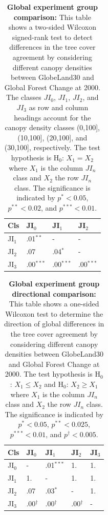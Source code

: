 			\begin{table}[ht]
				\centering
				\caption[Global experiment group comparison]{\textbf{Global experiment group comparison:} This table shows a two-sided Wilcoxon signed-rank test to detect differences in the tree cover agreement by considering different canopy densities between GlobeLand30 and Global Forest Change at 2000. The classes $JI_0$, $JI_1$, $JI_2$, and $JI_3$ as row and column headings account for the canopy density classes (0,100], (10,100], (20,100], and (30,100], respectively. The test hypothesis is H$_0$: $X_1=X_2$ where $X_1$ is the column $JI_n$ class and $X_2$ the row $JI_n$ class. The significance is indicated by $p^{*}<0.05$, $p^{**}<0.02$, and $p^{***}<0.01$.}
				\label{tab:wilcoxontwosided_all}
				\begin{tabular}{llll}
					\hline
					Cls & JI$_0$ & JI$_1$ & JI$_2$ \\\hline
					JI$_1$ & .01$^{**}$ & - & - \\
					JI$_2$ & .07 & .04$^{*}$ & - \\
					JI$_3$ & .00$^{***}$ & .00$^{***}$ & .00$^{***}$ \\\hline
				\end{tabular}
			\end{table}
			\begin{table}[ht]
				\centering
				\caption[Global experiment group directional comparison]{\textbf{Global experiment group directional comparison:} This table shows a one-sided Wilcoxon test to determine the direction of global differences in the tree cover agreement by considering different canopy densities between GlobeLand30 and Global Forest Change at 2000. The test hypothesis is H$_0$: $X_1\leq X_2$ and H$_0$: $X_2\geq X_1$ where $X_1$ is the column $JI_n$ class and $X_2$ the row $JI_n$ class. The significance is indicated by $p^{*}<0.05$, $p^{**}<0.025$, $p^{***}<0.01$, and $p^{\dagger}<0.005$.}
				\label{tab:wilcoxononesided_all}
				\begin{tabular}{lllll}
					\hline
					Cls & JI$_0$ & JI$_1$ & JI$_2$ & JI$_3$ \\\hline
					JI$_0$ & - & .01$^{***}$ & 1. & 1. \\
					JI$_1$ & 1. & - & 1. & 1. \\
					JI$_2$ & .07 & .03$^{*}$ & - & 1. \\
					JI$_3$ & .00$^{\dagger}$ & .00$^{\dagger}$ & .00$^{\dagger}$ & - \\\hline
				\end{tabular}
			\end{table}

